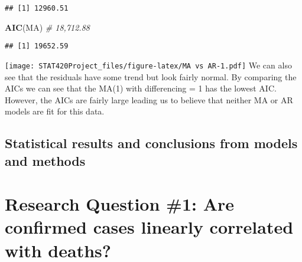 \documentclass[]{article}
\newenvironment{Shaded}{\begin{snugshade}}{\end{snugshade}}
\newcommand{\CommentTok}[1]{\textcolor[rgb]{0.56,0.35,0.01}{\textit{#1}}}
\newcommand{\DataTypeTok}[1]{\textcolor[rgb]{0.13,0.29,0.53}{#1}}
\newcommand{\DecValTok}[1]{\textcolor[rgb]{0.00,0.00,0.81}{#1}}
\newcommand{\KeywordTok}[1]{\textcolor[rgb]{0.13,0.29,0.53}{\textbf{#1}}}
\newcommand{\NormalTok}[1]{#1}
\newcommand{\OperatorTok}[1]{\textcolor[rgb]{0.81,0.36,0.00}{\textbf{#1}}}
\begin{document}
\begin{verbatim}
## [1] 12960.51
\end{verbatim}

\begin{Shaded}
\begin{Highlighting}[]
\KeywordTok{AIC}\NormalTok{(MA) }\CommentTok{# 18,712.88}
\end{Highlighting}
\end{Shaded}

\begin{verbatim}
## [1] 19652.59
\end{verbatim}

\begin{Shaded}
\end{Shaded}

\texttt{[image: STAT420Project\_files/figure-latex/MA vs AR-1.pdf]} We
can also see that the residuals have some trend but look fairly normal.
By comparing the AICs we can see that the MA(1) with differencing = 1
has the lowest AIC. However, the AICs are fairly large leading us to
believe that neither MA or AR models are fit for this data.

\hypertarget{statistical-results-and-conclusions-from-models-and-methods}{%
\subsection{Statistical results and conclusions from models and
methods}\label{statistical-results-and-conclusions-from-models-and-methods}}

\hypertarget{research-question-1-are-confirmed-cases-linearly-correlated-with-deaths}{%
\section{Research Question \#1: Are confirmed cases linearly correlated
with
deaths?}\label{research-question-1-are-confirmed-cases-linearly-correlated-with-deaths}}
\end{document}
